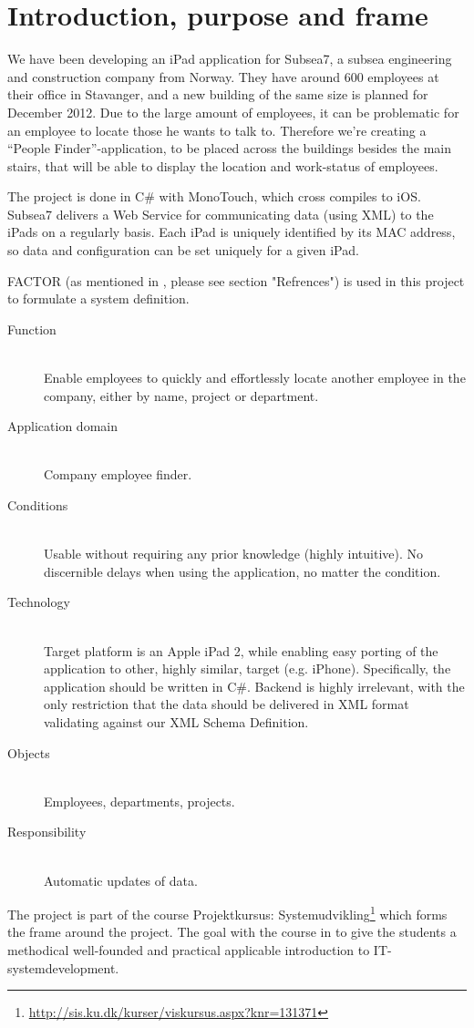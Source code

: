 \section{Introduction, purpose and frame}
We have been developing an iPad application for Subsea7, a subsea engineering and construction company from Norway.
They have around 600 employees at their office in Stavanger, and a new building of the same size is planned for December 2012. Due to the large amount of employees, it can be problematic for an employee to locate those he wants to talk to.
Therefore we're creating a “People Finder”-application, to be placed across the buildings besides the main stairs, that will be able to display the location and work-status of employees.

The project is done in C\# with MonoTouch, which cross compiles to iOS.
Subsea7 delivers a Web Service for communicating  data (using XML) to the iPads on a regularly basis. Each iPad is uniquely identified by its MAC address, so data and configuration can be set uniquely for a given iPad.

FACTOR (as mentioned in \cite{factor}, please see section "Refrences") is used in this project to
formulate a system definition.

\begin{description}
\item[Function] \hfill \\ Enable employees to quickly and effortlessly
  locate another employee in the company, either by name, project or
  department.
\item[Application domain] \hfill \\ Company employee finder.
\item[Conditions] \hfill \\ Usable without requiring any prior
  knowledge (highly intuitive). No discernible delays when using the
  application, no matter the condition.
\item[Technology] \hfill \\ Target platform is an Apple iPad 2, while
  enabling easy porting of the application to other, highly similar,
  target (e.g. iPhone). Specifically, the application should be
  written in C\#. Backend is highly irrelevant, with the only
  restriction that the data should be delivered in XML format
  validating against our XML Schema Definition.
\item[Objects] \hfill \\ Employees, departments, projects.
\item[Responsibility] \hfill \\ Automatic updates of data.
\end{description}

The project is part of the course Projektkursus: Systemudvikling\footnote{\url{http://sis.ku.dk/kurser/viskursus.aspx?knr=131371}}
which forms the frame around the project. The goal with the course in to give the students a methodical well-founded and practical
applicable introduction to IT-systemdevelopment.
